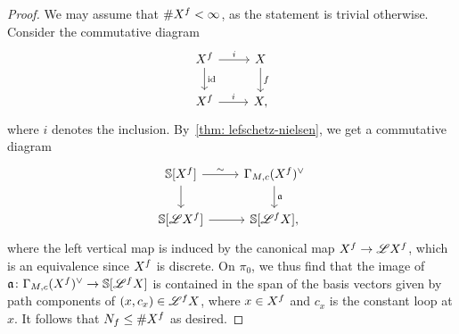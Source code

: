 \begin{proof}
  We may assume that $\# X^f < \infty$, as the statement is trivial otherwise. Consider the commutative diagram
  \[
    \begin{tikzcd}
      \tset^f\arrow[d,"\id"]\arrow[r,"i"] & \tset\arrow[d,"f"] \\
      \tset^f\arrow[r,"i"] & \tset,
    \end{tikzcd}
  \]
  where $i$ denotes the inclusion. By~\cref{thm: lefschetz-nielsen}, we get a commutative diagram
  \[
    \begin{tikzcd}
      \SS\lbrack \tset^f\rbrack \arrow[d] \arrow[r,"\sim"] & \pbmsec{X^f}{\base}\arrow[d,"\mathfrak a"] \\
      \SS\lbrack\cL \tset^f\rbrack\arrow[r] & \SS\lbrack\cL^f\tset\rbrack,
    \end{tikzcd}
  \]
  where the left vertical map is induced by the canonical map $X^f\to\mathscr{L} X^f$, which is an equivalence since $X^f$ is discrete. On $\pi_0$, we thus find that the image of $\mathfrak a\colon \Gamma_{M,c}(X^f)^{\vee}\to \mathbb{S}\lbrack\mathscr{L}^fX\rbrack$ is contained in the span of the basis vectors given by path components of $(x,c_x)\in\mathscr{L}^fX$, where $x\in X^f$ and $c_x$ is the constant loop at $x$. It follows that $N_f\leq\# X^f$ as desired.
\end{proof}



